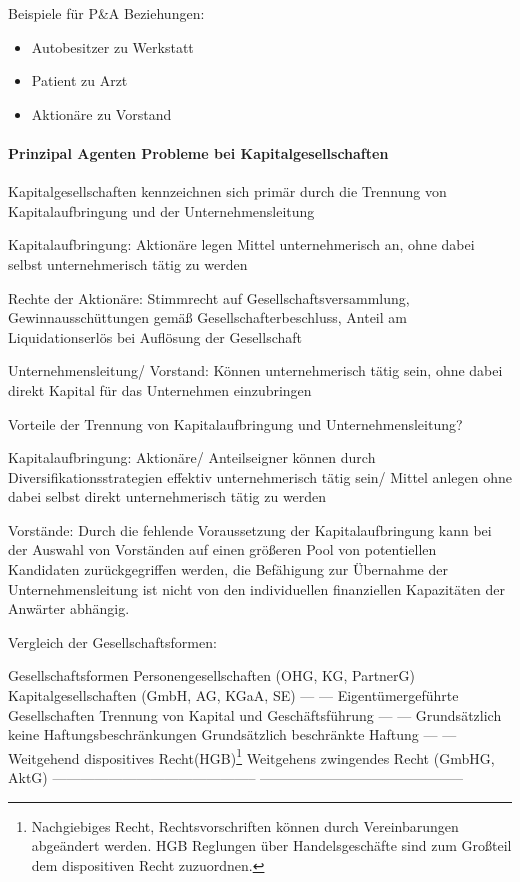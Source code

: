 \documentclass[
]{article}
\providecommand{\tightlist}{%
  \setlength{\itemsep}{0pt}\setlength{\parskip}{0pt}}
\begin{document}
Beispiele für P\&A Beziehungen:

\begin{itemize}
\tightlist
\item
  Autobesitzer zu Werkstatt
\item
  Patient zu Arzt
\item
  Aktionäre zu Vorstand
\end{itemize}

\hypertarget{prinzipal-agenten-probleme-bei-kapitalgesellschaften}{%
\paragraph{Prinzipal Agenten Probleme bei
Kapitalgesellschaften}\label{prinzipal-agenten-probleme-bei-kapitalgesellschaften}}

Kapitalgesellschaften kennzeichnen sich primär durch die Trennung von
Kapitalaufbringung und der Unternehmensleitung

Kapitalaufbringung: Aktionäre legen Mittel unternehmerisch an, ohne
dabei selbst unternehmerisch tätig zu werden

Rechte der Aktionäre: Stimmrecht auf Gesellschaftsversammlung,
Gewinnausschüttungen gemäß Gesellschafterbeschluss, Anteil am
Liquidationserlös bei Auflösung der Gesellschaft

Unternehmensleitung/ Vorstand: Können unternehmerisch tätig sein, ohne
dabei direkt Kapital für das Unternehmen einzubringen

Vorteile der Trennung von Kapitalaufbringung und Unternehmensleitung?

Kapitalaufbringung: Aktionäre/ Anteilseigner können durch
Diversifikationsstrategien effektiv unternehmerisch tätig sein/ Mittel
anlegen ohne dabei selbst direkt unternehmerisch tätig zu werden

Vorstände: Durch die fehlende Voraussetzung der Kapitalaufbringung kann
bei der Auswahl von Vorständen auf einen größeren Pool von potentiellen
Kandidaten zurückgegriffen werden, die Befähigung zur Übernahme der
Unternehmensleitung ist nicht von den individuellen finanziellen
Kapazitäten der Anwärter abhängig.

Vergleich der Gesellschaftsformen:

Gesellschaftsformen Personengesellschaften (OHG, KG, PartnerG)
\textbar{} Kapitalgesellschaften (GmbH, AG, KGaA, SE) --- \textbar{} ---
Eigentümergeführte Gesellschaften \textbar{} Trennung von Kapital und
Geschäftsführung --- \textbar{} --- Grundsätzlich keine
Haftungsbeschränkungen \textbar{} Grundsätzlich beschränkte Haftung ---
\textbar{} --- Weitgehend dispositives Recht(HGB)\footnote{Nachgiebiges
  Recht, Rechtsvorschriften können durch Vereinbarungen abgeändert
  werden. HGB Reglungen über Handelsgeschäfte sind zum Großteil dem
  dispositiven Recht zuzuordnen.} \textbar{} Weitgehens zwingendes Recht
(GmbHG, AktG) --------------------------------------------
--------------------------------------------
\end{document}
